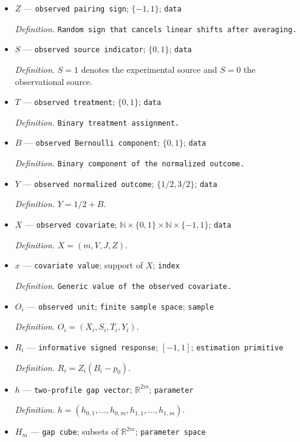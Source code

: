 \documentclass{article}
\begin{document}
\begin{itemize}
  \item \(Z\) --- \texttt{observed pairing sign}; \(\{-1,1\}\); \texttt{data}
  \par\smallskip\noindent\emph{Definition.} \texttt{Random sign that cancels linear shifts after averaging.}
  \item \(S\) --- \texttt{observed source indicator}; \(\{0,1\}\); \texttt{data}
  \par\smallskip\noindent\emph{Definition.} \(S=1\) denotes the experimental source and \(S=0\) the observational source.
  \item \(T\) --- \texttt{observed treatment}; \(\{0,1\}\); \texttt{data}
  \par\smallskip\noindent\emph{Definition.} \texttt{Binary treatment assignment.}
  \item \(B\) --- \texttt{observed Bernoulli component}; \(\{0,1\}\); \texttt{data}
  \par\smallskip\noindent\emph{Definition.} \texttt{Binary component of the normalized outcome.}
  \item \(Y\) --- \texttt{observed normalized outcome}; \(\{1/2,3/2\}\); \texttt{data}
  \par\smallskip\noindent\emph{Definition.} \(Y=1/2+B\).
  \item \(X\) --- \texttt{observed covariate}; \(\mathbb N\times\{0,1\}\times\mathbb N\times\{-1,1\}\); \texttt{data}
  \par\smallskip\noindent\emph{Definition.} \(X=(m,V,J,Z)\).
  \item \(x\) --- \texttt{covariate value}; support of \(X\); \texttt{index}
  \par\smallskip\noindent\emph{Definition.} \texttt{Generic value of the observed covariate.}
  \item \(O_i\) --- \texttt{observed unit}; \texttt{finite sample space}; \texttt{sample}
  \par\smallskip\noindent\emph{Definition.} \(O_i=(X_i,S_i,T_i,Y_i)\).
  \item \(R_i\) --- \texttt{informative signed response}; \([-1,1]\); \texttt{estimation primitive}
  \par\smallskip\noindent\emph{Definition.} \(R_i=Z_i(B_i-p_0)\).
  \item \(h\) --- \texttt{two-\allowbreak{}profile gap vector}; \(\mathbb R^{2m}\); \texttt{parameter}
  \par\smallskip\noindent\emph{Definition.} \(h=(h_{0,1},\ldots,h_{0,m},h_{1,1},\ldots,h_{1,m})\).
  \item \(H_m\) --- \texttt{gap cube}; subsets of \(\mathbb R^{2m}\); \texttt{parameter space}

\end{itemize}
\end{document}
